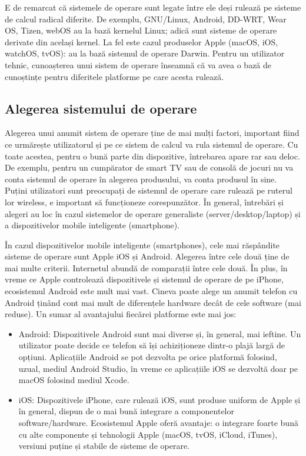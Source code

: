 E de remarcat că sistemele de operare sunt legate între ele deși rulează pe sisteme de calcul radical diferite.
De exemplu, GNU/Linux, Android, DD-WRT, Wear OS, Tizen, webOS au la bază kernelul Linux;
adică sunt sisteme de operare derivate din același kernel.
La fel este cazul produselor Apple (macOS, iOS, watchOS, tvOS): au la bază sistemul de operare Darwin.
Pentru un utilizator tehnic, cunoașterea unui sistem de operare înseamnă că va avea o bază de cunoștințe pentru diferitele platforme pe care acesta rulează.

\subsection{Alegerea sistemului de operare}
\label{sec:intro:pick}

Alegerea unui anumit sistem de operare ține de mai mulți factori, important fiind ce urmărește utilizatorul și pe ce sistem de calcul va rula sistemul de operare.
Cu toate acestea, pentru o bună parte din dispozitive, întrebarea apare rar sau deloc.
De exemplu, pentru un cumpărator de smart TV sau de consolă de jocuri nu va conta sistemul de operare în alegerea produsului, va conta produsul în sine.
Puțini utilizatori sunt preocupați de sistemul de operare care rulează pe ruterul lor wireless, e important să funcționeze corespunzător.
În general, întrebări și alegeri au loc în cazul sistemelor de operare generaliste (server/desktop/laptop) și a dispozitivelor mobile inteligente (smartphone).

În cazul dispozitivelor mobile inteligente (smartphones), cele mai răspândite sisteme de operare sunt Apple iOS și Android.
Alegerea între cele două ține de mai multe criterii.
Internetul abundă de comparații între cele două.
În plus, în vreme ce Apple controlează dispozitivele și sistemul de operare de pe iPhone, ecosistemul Android este mult mai vast.
Cineva poate alege un anumit telefon cu Android ținând cont mai mult de diferențele hardware decât de cele software (mai reduse).
Un sumar al avantajului fiecărei platforme este mai jos:

\begin{itemize}
  \item Android: Dispozitivele Android sunt mai diverse și, în general, mai ieftine.
    Un utilizator poate decide ce telefon să își achiziționeze dintr-o plajă largă de opțiuni.
    Aplicațiile Android se pot dezvolta pe orice platformă folosind, uzual, mediul Android Studio, în vreme ce aplicațiile iOS se dezvoltă doar pe macOS folosind mediul Xcode.
  \item iOS: Dispozitivele iPhone, care rulează iOS, sunt produse uniform de Apple și în general, dispun de o mai bună integrare a componentelor software/hardware.
    Ecosistemul Apple oferă avantaje: o integrare foarte bună cu alte componente și tehnologii Apple (macOS, tvOS, iCloud, iTunes), versiuni puține și stabile de sisteme de operare.
\end{itemize}

